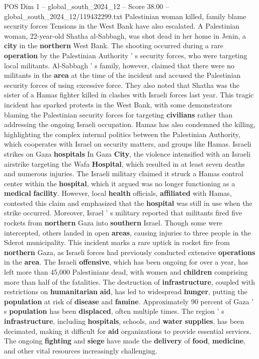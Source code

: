 \begin{textsample}{POS Dim 1 – global\_south\_2024\_12 – Score 38.00 – global\_south\_2024\_12/119432299.txt}
Palestinian woman killed, family blame security forces Tensions in the West Bank have also escalated.
A Palestinian woman, 22-year-old Shatha al-Sabbagh, was shot dead in her home in Jenin, a \textbf{city} in the \textbf{northern} West Bank.
The shooting occurred during a rare \textbf{operation} by the Palestinian Authority ' s security forces, who were targeting local militants.
Al-Sabbagh ' s family, however, claimed that there were no militants in the \textbf{area} at the time of the incident and accused the Palestinian security forces of using excessive force.
They also noted that Shatha was the sister of a Hamas fighter killed in clashes with Israeli forces last year.
This tragic incident has sparked protests in the West Bank, with some demonstrators blaming the Palestinian security forces for targeting \textbf{civilians} rather than addressing the ongoing Israeli occupation.
Hamas has also condemned the killing, highlighting the complex internal politics between the Palestinian Authority, which cooperates with Israel on security matters, and groups like Hamas.
Israeli strikes on Gaza \textbf{hospitals} In Gaza \textbf{City}, the violence intensified with an Israeli airstrike targeting the Wafa \textbf{Hospital}, which resulted in at least seven deaths and numerous injuries.
The Israeli military claimed it struck a Hamas control center within the \textbf{hospital}, which it argued was no longer functioning as a \textbf{medical} \textbf{facility}.
However, local \textbf{health} officials, \textbf{affiliated} with Hamas, contested this claim and emphasized that the \textbf{hospital} was still in use when the strike occurred.
Moreover, Israel ' s military reported that militants fired five rockets from \textbf{northern} Gaza into \textbf{southern} Israel.
Though some were intercepted, others landed in open \textbf{areas}, causing injuries to three people in the Sderot municipality.
This incident marks a rare uptick in rocket fire from \textbf{northern} Gaza, as Israeli forces had previously conducted extensive \textbf{operations} in the \textbf{area}.
The Israeli \textbf{offensive}, which has been ongoing for over a year, has left more than 45,000 Palestinians dead, with women and \textbf{children} comprising more than half of the fatalities.
The destruction of \textbf{infrastructure}, coupled with restrictions on \textbf{humanitarian} \textbf{aid}, has led to widespread \textbf{hunger}, putting the \textbf{population} at risk of \textbf{disease} and \textbf{famine}.
Approximately 90 percent of Gaza ' s \textbf{population} has been \textbf{displaced}, often multiple times.
The region ' s \textbf{infrastructure}, including \textbf{hospitals}, schools, and \textbf{water} \textbf{supplies}, has been decimated, making it difficult for \textbf{aid} organizations to provide essential services.
The ongoing \textbf{fighting} and \textbf{siege} have made the \textbf{delivery} of \textbf{food}, \textbf{medicine}, and other vital resources increasingly challenging.


\end{textsample}
